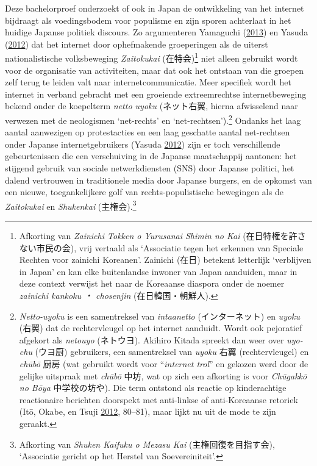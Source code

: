 \documentclass[10.5pt,dutch,]{article}
\begin{document}
Deze bachelorproef onderzoekt of ook in Japan de ontwikkeling van het
internet bijdraagt als voedingsbodem voor populisme en zijn sporen
achterlaat in het huidige Japanse politiek discours. Zo argumenteren
Yamaguchi
(\protect\hyperlink{ref-yamaguchiux5fxenophobiaux5f2013}{2013}) en
Yasuda (\protect\hyperlink{ref-yasudaux5fnettoux5f2012}{2012}) dat het
internet door ophefmakende groeperingen als de uiterst nationalistische
volksbeweging \emph{Zaitokukai} (在特会)\footnote{Afkorting van
  \emph{Zainichi Tokken o Yurusanai Shimin no Kai}
  (在日特権を許さない市民の会), vrij vertaald als `Associatie tegen het
  erkennen van Speciale Rechten voor zainichi Koreanen'. Zainichi (在日)
  betekent letterlijk `verblijven in Japan' en kan elke buitenlandse
  inwoner van Japan aanduiden, maar in deze context verwijst het naar de
  Koreaanse diaspora onder de noemer \emph{zainichi kankoku ・
  chosenjin} (在日韓国・朝鮮人).} niet alleen gebruikt wordt voor de
organisatie van activiteiten, maar dat ook het ontstaan van die groepen
zelf terug te leiden valt naar internetcommunicatie. Meer specifiek
wordt het internet in verband gebracht met een groeiende extreemrechtse
internetbeweging bekend onder de koepelterm \emph{netto uyoku}
(ネット右翼, hierna afwisselend naar verwezen met de neologismen `net-rechts'
en `net-rechtsen').\footnote{\emph{Netto-uyoku} is een samentreksel van
  \emph{intaanetto} (インターネット) en \emph{uyoku} (右翼) dat de
  rechtervleugel op het internet aanduidt. Wordt ook pejoratief afgekort
  als \emph{netouyo} (ネトウヨ). Akihiro Kitada spreekt dan weer over
  \emph{uyo-chu} (ウヨ厨) gebruikers, een samentreksel van \emph{uyoku}
  右翼 (rechtervleugel) en \emph{chūbō} 厨房 (wat gebruikt wordt voor
  ``\emph{internet trol}'' en gekozen werd door de gelijke uitspraak met
  \emph{chūbō} 中坊, wat op zich een afkorting is voor \emph{Chūgakkō no
  Bōya} 中学校の坊や). Die term ontstond als reactie op kinderachtige
  reactionaire berichten doorspekt met anti-linkse of anti-Koreaanse
  retoriek (Itō, Okabe, en Tsuji
  \protect\hyperlink{ref-itoux5ffandomux5f2012}{2012}, 80--81), maar
  lijkt nu uit de mode te zijn geraakt.} Ondanks het laag aantal
aanwezigen op protestacties en een laag geschatte aantal net-rechtsen
onder Japanse internetgebruikers (Yasuda
\protect\hyperlink{ref-yasudaux5fnettoux5f2012}{2012}) zijn er toch
verschillende gebeurtenissen die een verschuiving in de Japanse
maatschappij aantonen: het stijgend gebruik van sociale netwerkdiensten
(SNS) door Japanse politici, het dalend vertrouwen in traditionele media
door Japanse burgers, en de opkomst van een nieuwe, toegankelijkere golf
van rechts-populistische bewegingen als de \emph{Zaitokukai} en
\emph{Shukenkai} (主権会).\footnote{Afkorting van \emph{Shuken Kaifuku o
  Mezasu Kai} (主権回復を目指す会), `Associatie gericht op het Herstel
  van Soevereiniteit'.}
\end{document}
